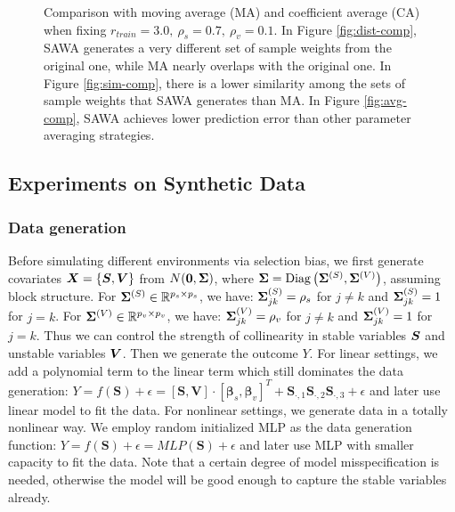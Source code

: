 \begin{figure*}[t]
	\centering
	\caption{Comparison with moving average (MA) and coefficient average (CA) when fixing $r_{train}=3.0,\ \rho_s=0.7,\ \rho_v=0.1$. 
    In Figure \ref{fig:dist-comp}, SAWA generates a very different set of sample weights from the original one, while MA nearly overlaps with the original one. 
    In Figure \ref{fig:sim-comp}, there is a lower similarity among the sets of sample weights that SAWA generates than MA. 
    In Figure \ref{fig:avg-comp}, SAWA achieves lower prediction error than other parameter averaging strategies. 
    }
	\label{fig:comp}
\end{figure*}

\subsection{Experiments on Synthetic Data}
\label{sec:synthetic}

\subsubsection{Data generation}
Before simulating different environments via selection bias, we first generate covariates $\boldsymbol{X}=\{\boldsymbol{S}, \boldsymbol{V}\}$ from $N(\boldsymbol{0}, \boldsymbol{\Sigma})$, where $\boldsymbol{\Sigma}={\rm Diag}\left( \boldsymbol{\Sigma}^{(S)}, \boldsymbol{\Sigma}^{(V)} \right)$, assuming block structure. 
For $\boldsymbol{\Sigma}^{(S)} \in \mathbb{R}^{p_s \times p_s}$, we have: $\boldsymbol{\Sigma}^{(S)}_{jk}=\rho_s$ for $j \neq k$ and $\boldsymbol{\Sigma}^{(S)}_{jk}=1$ for $j=k$. 
For $\boldsymbol{\Sigma}^{(V)} \in \mathbb{R}^{p_v \times p_v}$, we have: $\boldsymbol{\Sigma}^{(V)}_{jk}=\rho_v$ for $j \neq k$ and $\boldsymbol{\Sigma}^{(V)}_{jk}=1$ for $j=k$. 
Thus we can control the strength of collinearity in stable variables $\boldsymbol{S}$ and unstable variables $\boldsymbol{V}$. 
Then we generate the outcome $Y$. 
For linear settings, we add a polynomial term to the linear term which still dominates the data generation:  
$
    Y=f(\boldsymbol{S})+\epsilon=[\boldsymbol{S}, \boldsymbol{V}]\cdot [\boldsymbol{\beta}_s, \boldsymbol{\beta}_v]^T + \boldsymbol{S}_{\cdot, 1}\boldsymbol{S}_{\cdot, 2}\boldsymbol{S}_{\cdot, 3} + \epsilon
$ and later use linear model to fit the data. 
For nonlinear settings, we generate data in a totally nonlinear way. We employ random initialized MLP as the data generation function: 
$
    Y=f(\boldsymbol{S})+\epsilon = MLP(\boldsymbol{S})+\epsilon 
$ and later use MLP with smaller capacity to fit the data. 
Note that a certain degree of model misspecification is needed, otherwise the model will be good enough to capture the stable variables already. 

